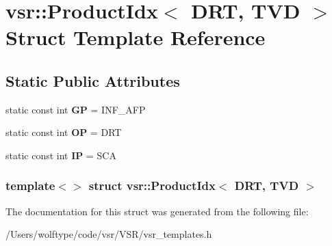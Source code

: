 \hypertarget{structvsr_1_1_product_idx_3_01_d_r_t_00_01_t_v_d_01_4}{\section{vsr\-:\-:Product\-Idx$<$ D\-R\-T, T\-V\-D $>$ Struct Template Reference}
\label{structvsr_1_1_product_idx_3_01_d_r_t_00_01_t_v_d_01_4}
}
\subsection*{Static Public Attributes}
\begin{DoxyCompactItemize}
\item 
\hypertarget{structvsr_1_1_product_idx_3_01_d_r_t_00_01_t_v_d_01_4_a455550b7ee62a068099140806c609cae}{static const int {\bfseries G\-P} = I\-N\-F\-\_\-\-A\-F\-P}\label{structvsr_1_1_product_idx_3_01_d_r_t_00_01_t_v_d_01_4_a455550b7ee62a068099140806c609cae}

\item 
\hypertarget{structvsr_1_1_product_idx_3_01_d_r_t_00_01_t_v_d_01_4_a85b729a2012c1aa4165b6aba9eec2659}{static const int {\bfseries O\-P} = D\-R\-T}\label{structvsr_1_1_product_idx_3_01_d_r_t_00_01_t_v_d_01_4_a85b729a2012c1aa4165b6aba9eec2659}

\item 
\hypertarget{structvsr_1_1_product_idx_3_01_d_r_t_00_01_t_v_d_01_4_a28bc7fc2e0ebde11835c6651ad284aba}{static const int {\bfseries I\-P} = S\-C\-A}\label{structvsr_1_1_product_idx_3_01_d_r_t_00_01_t_v_d_01_4_a28bc7fc2e0ebde11835c6651ad284aba}

\end{DoxyCompactItemize}
\subsubsection*{template$<$$>$ struct vsr\-::\-Product\-Idx$<$ D\-R\-T, T\-V\-D $>$}



The documentation for this struct was generated from the following file\-:\begin{DoxyCompactItemize}
\item 
/\-Users/wolftype/code/vsr/\-V\-S\-R/vsr\-\_\-templates.\-h\end{DoxyCompactItemize}
